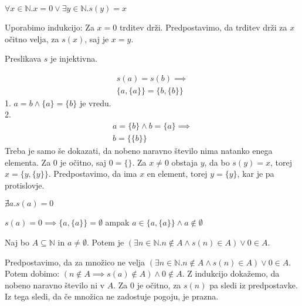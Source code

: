 \begin{trditev}
    $\forall x \in \mathbb{N}. x = 0 \vee \exists y \in \mathbb{N}. s(y) = x$
\end{trditev}
\begin{dokaz}
    Uporabimo indukcijo: Za $x = 0$ trditev drži.
    Predpostavimo, da trditev drži za $x$ očitno velja, za $s(x)$, saj je $x = y$.
\end{dokaz}

\begin{trditev}
    Preslikava $s$ je injektivna.
\end{trditev}
\begin{dokaz}
    \begin{align*}
        s(a) = s(b) \implies \\
        \{a,\{a\}\} = \{b,\{b\}\}
    \end{align*}
    1. $a = b \wedge \{a\} = \{b\}$ je vredu. \\
    2.
    \begin{align*}
        a = \{b\} \wedge b = \{a\} \implies \\
        b = \{\{b\}\}
    \end{align*}
    Treba je samo še dokazati, da nobeno naravno število nima natanko enega elementa.
    Za $0$ je očitno, saj $0 = \{\}$.
    Za $x \neq 0$ obstaja $y$, da bo $s(y) = x$, torej $x = \{y, \{y\}\}$.
    Predpostavimo, da ima $x$ en element, torej $y = \{y\}$, kar je pa protislovje.
\end{dokaz}

\begin{trditev}
    $\nexists a. s(a) = 0$
\end{trditev}
\begin{dokaz}
    $s(a) = 0 \implies \{a, \{a\}\} = \emptyset$ ampak $a \in \{a, \{a\}\} \wedge a \notin \emptyset$
\end{dokaz}

\begin{trditev}
    Naj bo $A \subseteq \mathbb{N}$ in $a \neq \emptyset$.
    Potem je $(\exists n \in \mathbb{N}. n \notin A \wedge s(n) \in A) \vee 0 \in A$.
\end{trditev}
\begin{dokaz}
    Predpostavimo, da za množico ne velja $(\exists n \in \mathbb{N}. n \notin A \wedge s(n) \in A) \vee 0 \in A$. \\
    Potem dobimo: $(n \notin A \implies s(a) \notin A) \wedge 0 \notin A$.
    Z indukcijo dokažemo, da nobeno naravno število ni v $A$.
    Za $0$ je očitno, za $s(n)$ pa sledi iz predpostavke.
    Iz tega sledi, da če množica ne zadostuje pogoju, je prazna.
\end{dokaz}

